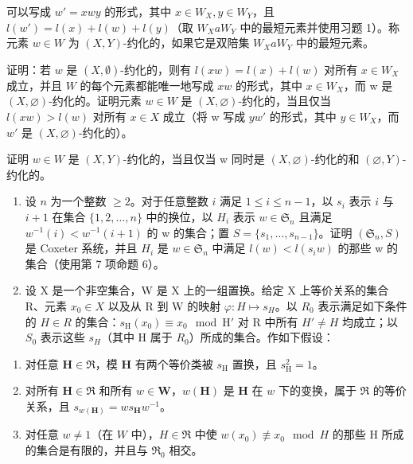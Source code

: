 可以写成 \(w' = xwy\) 的形式，其中 \(x \in W_X, y \in W_Y\)，且 \(l(w') = l(x) + l(w) + l(y)\)（取 \(W_X aW_Y\) 中的最短元素并使用习题 1）。称元素 \(w \in W\) 为 \((X,Y)\)-约化的，如果它是双陪集 \(W_X aW_Y\) 中的最短元素。

证明：若 \(w\) 是 \((X, \emptyset)\)-约化的，则有 \(l(xw) = l(x) + l(w)\) 对所有 \(x \in W_X\) 成立，并且 \(W\) 的每个元素都能唯一地写成 \(xw\) 的形式，其中 \(x \in W_{X}\)，而 w 是 \((X, \varnothing)\)-约化的。证明元素 \(w \in W\) 是 \((X, \varnothing)\)-约化的，当且仅当 \(l(xw) > l(w)\) 对所有 \(x \in X\) 成立（将 w 写成 \(yw'\) 的形式，其中 \(y \in W_{X}\)，而 \(w'\) 是 \((X, \varnothing)\)-约化的）。

证明 \(w \in W\) 是 \((X, Y)\)-约化的，当且仅当 w 同时是 \((X, \varnothing)\)-约化的和 \((\varnothing, Y)\)-约化的。

\begin{enumerate}
\def\labelenumi{\arabic{enumi})}
\setcounter{enumi}{3}
\item
  设 \(n\) 为一个整数 \(\geqslant 2\)。对于任意整数 \(i\) 满足 \(1 \leqslant i \leqslant n - 1\)，以 \(s_i\) 表示 \(i\) 与 \(i + 1\) 在集合 \(\{1, 2, \ldots, n\}\) 中的换位，以 \(H_i\) 表示 \(w \in \mathfrak{S}_n\) 且满足 \(w^{-1}(i) < w^{-1}(i + 1)\) 的 w 的集合；置 \(S = \{s_1, \ldots, s_{n-1}\}\)。证明 \((\mathfrak{S}_n, S)\) 是 Coxeter 系统，并且 \(H_i\) 是 \(w \in \mathfrak{S}_n\) 中满足 \(l(w) < l(s_i w)\) 的那些 w 的集合（使用第 7 项命题 6）。
\item
  设 X 是一个非空集合，W 是 X 上的一组置换。给定 X 上等价关系的集合 R、元素 \(x_{0} \in X\) 以及从 R 到 W 的映射 \(\varphi : H \mapsto s_{H}\)。以 \(R_{0}\) 表示满足如下条件的 \(H \in R\) 的集合：\(s_{\mathrm{H}}(x_{0}) \equiv x_{0} \mod \mathrm{H}'\) 对 R 中所有 \(H' \neq H\) 均成立；以 \(S_{0}\) 表示这些 \(s_{H}\)（其中 H 属于 \(R_{0}\)）所成的集合。作如下假设：
\end{enumerate}

\begin{enumerate}
\def\labelenumi{(\roman{enumi})}
\item
  对任意 \(\mathbf{H} \in \Re\)，模 \(\mathbf{H}\) 有两个等价类被 \(s_{\mathrm{H}}\) 置换，且 \(s_{\mathrm{H}}^{2} = 1\)。
\item
  对所有 \(\mathbf{H} \in \Re\) 和所有 \(w \in \mathbf{W}\)，\(w(\mathbf{H})\) 是 \(\mathbf{H}\) 在 \(w\) 下的变换，属于 \(\Re\) 的等价关系，且 \(s_{w(\mathbf{H})} = ws_{\mathbf{H}}w^{-1}\)。
\item
  对任意 \(w \neq 1\)（在 \(W\) 中），\(H \in \Re\) 中使 \(w(x_0) \not\equiv x_0 \mod H\) 的那些 H 所成的集合是有限的，并且与 \(\Re_0\) 相交。
\end{enumerate}

